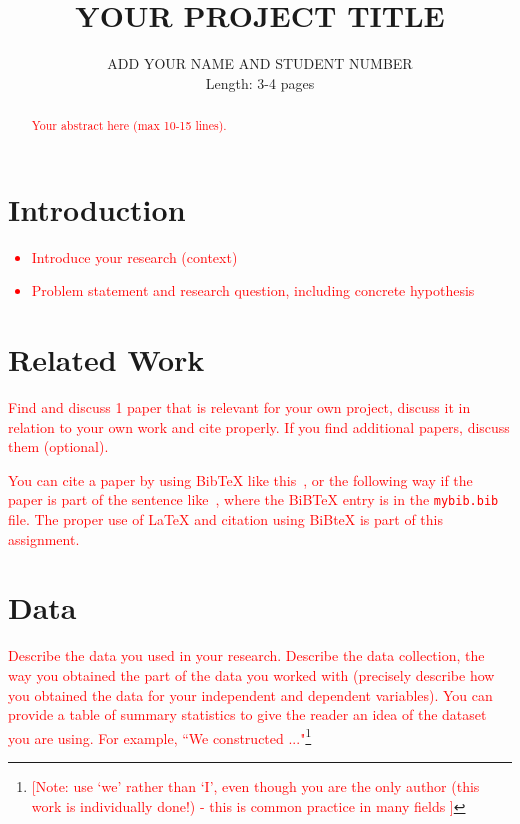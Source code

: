 \documentclass[11pt]{article}
\title{YOUR PROJECT TITLE}
\author{ADD YOUR NAME AND STUDENT NUMBER\\
Length: 3-4 pages}
\date{}
\begin{document}
\maketitle

\begin{abstract}
\textcolor{red}{Your abstract here (max 10-15 lines).}
\end{abstract}


\section{Introduction}

\textcolor{red}{
\begin{itemize}
\item Introduce your research (context)
\item Problem statement and research question, including concrete hypothesis
\end{itemize}
} 

\section{Related Work}

\textcolor{red}{Find and discuss 1 paper that is relevant for your own project, discuss it in relation to your own work and cite properly. If you find additional papers, discuss them (optional).}

\textcolor{red}{You can cite a paper by using BibTeX like this~\citep{Culotta:ea:2014}, or the following way if the paper is part of the sentence like~\cite{Culotta:ea:2014}, where the BiBTeX entry is in the \texttt{mybib.bib} file. The proper use of \LaTeX{} and citation using BiBteX is part of this assignment.} 

\section{Data}

\textcolor{red}{Describe the data you used in your research. Describe the data collection, the way you obtained the part of the data you worked with (precisely describe how you obtained the data for your independent and dependent variables). You can provide a table of summary statistics to give the reader an idea of the dataset you are using. For example, ``We constructed ..."\footnote{\textcolor{red}{[Note: use `we' rather than `I', even though you are the only author (this work is individually done!) - this is common practice in many fields ]}}}
\end{document}
